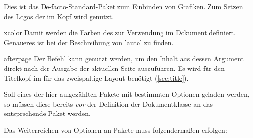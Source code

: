 \begin{packages}
  Dies ist das De-facto-Standard-Paket zum Einbinden von Grafiken. Zum Setzen 
  des Logos der \TnUD im Kopf wird  genutzt.
\item[xcolor]
  Damit werden die Farben des \CDs zur Verwendung im Dokument definiert. 
  Genaueres ist bei der Beschreibung von 'auto' zu finden.
\item[afterpage]
  Der Befehl \Parameter{\dots} kann genutzt werden, um den 
  Inhalt aus dessen Argument direkt nach der Ausgabe der aktuellen Seite 
  auszuführen. Es wird für den Titelkopf im \CD für das zweispaltige Layout 
  benötigt (\autoref{sec:title}).
\end{packages}
%
Soll eines der hier aufgezählten Pakete mit bestimmten Optionen geladen werden, 
so müssen diese bereits \emph{vor} der Definition der Dokumentklasse an das 
entsprechende Paket werden.
%
\begin{Example}
Das Weiterreichen von Optionen an Pakete muss folgendermaßen erfolgen:
\end{Example}\vspace{-\baselineskip}%




